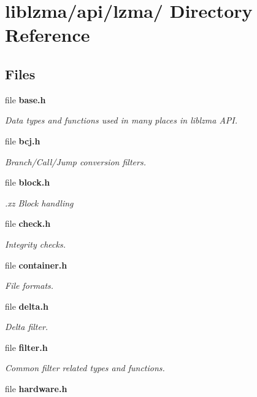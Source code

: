 \section{liblzma/api/lzma/ Directory Reference}
\label{dir_48cf7e51417fe935412ca5117cfff3c4}
\subsection*{Files}
\begin{DoxyCompactItemize}
\item 
file {\bf base.\-h}
\begin{DoxyCompactList}\small\item\em Data types and functions used in many places in liblzma A\-P\-I. \end{DoxyCompactList}\item 
file {\bf bcj.\-h}
\begin{DoxyCompactList}\small\item\em Branch/\-Call/\-Jump conversion filters. \end{DoxyCompactList}\item 
file {\bf block.\-h}
\begin{DoxyCompactList}\small\item\em .xz Block handling \end{DoxyCompactList}\item 
file {\bf check.\-h}
\begin{DoxyCompactList}\small\item\em Integrity checks. \end{DoxyCompactList}\item 
file {\bf container.\-h}
\begin{DoxyCompactList}\small\item\em File formats. \end{DoxyCompactList}\item 
file {\bf delta.\-h}
\begin{DoxyCompactList}\small\item\em Delta filter. \end{DoxyCompactList}\item 
file {\bf filter.\-h}
\begin{DoxyCompactList}\small\item\em Common filter related types and functions. \end{DoxyCompactList}\item 
file {\bf hardware.\-h}

\end{DoxyCompactItemize}
